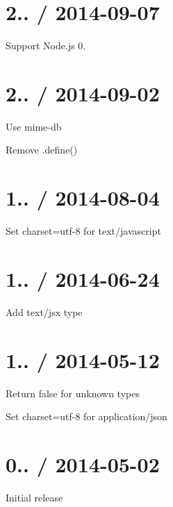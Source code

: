 \section*{2.. / 2014-\/09-\/07 }


\begin{DoxyItemize}
\item Support Node.\+js 0.
\end{DoxyItemize}

\section*{2.. / 2014-\/09-\/02 }


\begin{DoxyItemize}
\item Use {\ttfamily mime-\/db}
\item Remove {\ttfamily .define()}
\end{DoxyItemize}

\section*{1.. / 2014-\/08-\/04 }


\begin{DoxyItemize}
\item Set charset=utf-\/8 for {\ttfamily text/javascript}
\end{DoxyItemize}

\section*{1.. / 2014-\/06-\/24 }


\begin{DoxyItemize}
\item Add {\ttfamily text/jsx} type
\end{DoxyItemize}

\section*{1.. / 2014-\/05-\/12 }


\begin{DoxyItemize}
\item Return {\ttfamily false} for unknown types
\item Set charset=utf-\/8 for {\ttfamily application/json}
\end{DoxyItemize}

\section*{0.. / 2014-\/05-\/02 }


\begin{DoxyItemize}
\item Initial release 
\end{DoxyItemize}